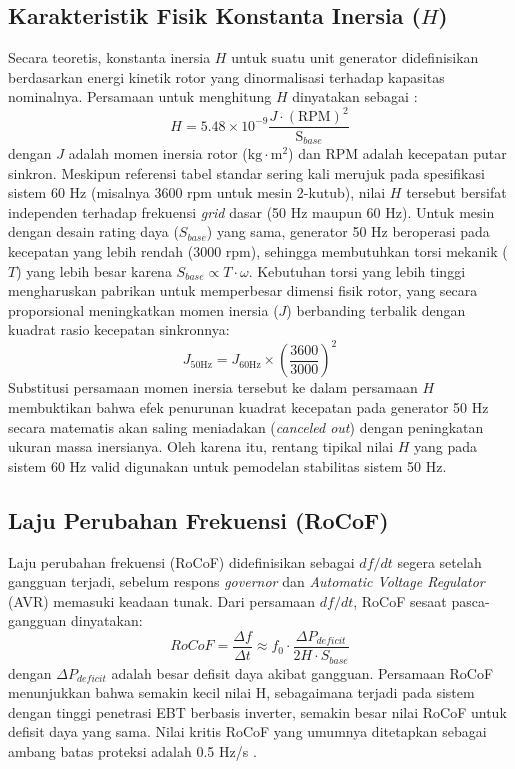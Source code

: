 \subsection{Karakteristik Fisik Konstanta Inersia ($H$)}
\label{subsec:Karakteristik_Fisik_Konstanta_Inersia}
Secara teoretis, konstanta inersia $H$ untuk suatu unit generator didefinisikan berdasarkan energi kinetik rotor yang dinormalisasi terhadap kapasitas nominalnya. Persamaan untuk menghitung $H$ dinyatakan sebagai \cite{Kundur1994}:
\begin{equation}
    H = 5{.}48 \times 10^{-9} \frac{J \cdot (\text{RPM})^2}{\text{S}_{base}}
\end{equation}
dengan $J$ adalah momen inersia rotor ($\text{kg}\cdot\text{m}^2$) dan RPM adalah kecepatan putar sinkron. Meskipun referensi tabel standar sering kali merujuk pada spesifikasi sistem 60 Hz (misalnya 3600 rpm untuk mesin 2-kutub), nilai $H$ tersebut bersifat independen terhadap frekuensi \textit{grid} dasar (50 Hz maupun 60 Hz). Untuk mesin dengan desain rating daya ($S_{base}$) yang sama, generator 50 Hz beroperasi pada kecepatan yang lebih rendah (3000 rpm), sehingga membutuhkan torsi mekanik ($T$) yang lebih besar karena $S_{base} \propto T \cdot \omega$. Kebutuhan torsi yang lebih tinggi mengharuskan pabrikan untuk memperbesar dimensi fisik rotor, yang secara proporsional meningkatkan momen inersia ($J$) berbanding terbalik dengan kuadrat rasio kecepatan sinkronnya:
\begin{equation}
    J_{50\text{Hz}} = J_{60\text{Hz}} \times \left(\frac{3600}{3000}\right)^2
\end{equation}
Substitusi persamaan momen inersia tersebut ke dalam persamaan $H$ membuktikan bahwa efek penurunan kuadrat kecepatan pada generator 50 Hz secara matematis akan saling meniadakan (\textit{canceled out}) dengan peningkatan ukuran massa inersianya. Oleh karena itu, rentang tipikal nilai $H$ yang pada sistem 60 Hz valid digunakan untuk pemodelan stabilitas sistem 50 Hz.

\subsection{Laju Perubahan Frekuensi (RoCoF)}
\label{subsec:Laju_Perubahan_Frekuensi}

Laju perubahan frekuensi (RoCoF) didefinisikan sebagai $df/dt$ segera setelah gangguan terjadi, sebelum respons \textit{governor} dan \textit{Automatic Voltage Regulator} (AVR) memasuki keadaan tunak. Dari persamaan $df/dt$, RoCoF sesaat pasca-gangguan dinyatakan:
\begin{equation}
    RoCoF = \frac{\Delta f}{\Delta t} \approx f_{0} \cdot \frac{\Delta P_{deficit}}{2H \cdot S_{base}}
\end{equation}
dengan $\Delta P_{deficit}$ adalah besar defisit daya akibat gangguan. Persamaan RoCoF menunjukkan bahwa semakin kecil nilai H, sebagaimana terjadi pada sistem dengan tinggi penetrasi EBT berbasis inverter, semakin besar nilai RoCoF untuk defisit daya yang sama. Nilai kritis RoCoF yang umumnya ditetapkan sebagai ambang batas proteksi adalah 0.5 Hz/s \cite{Kundur1994, Drhorhi2024}.

